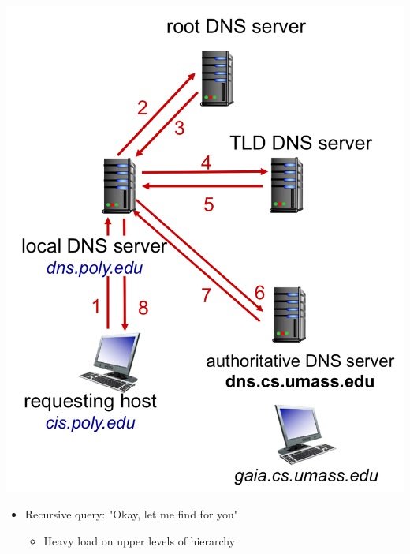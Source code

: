 \documentclass{article}
\begin{document}
\begin{multicols*}{3}
\includegraphics[scale=0.1]{dns-iterative-query}

\begin{itemize}
    \item Recursive query: "Okay, let me find for you"
    \begin{itemize}
        \item Heavy load on upper levels of hierarchy
    \end{itemize}
\end{itemize}


\end{multicols*}
\end{document}
